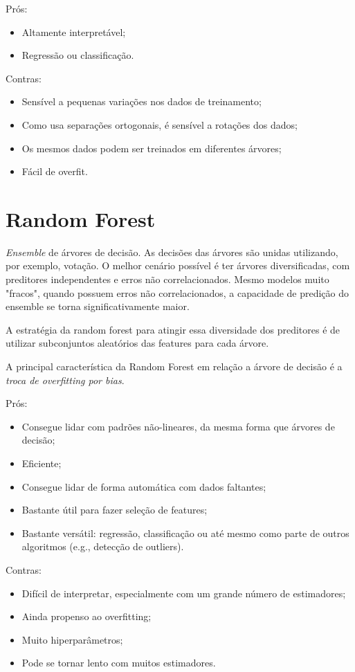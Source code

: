 Prós:
\begin{itemize}
    \item Altamente interpretável;
    \item Regressão ou classificação.
\end{itemize}
Contras:
\begin{itemize}
    \item Sensível a pequenas variações nos dados de treinamento;
    \item Como usa separações ortogonais, é sensível a rotações dos dados;
    \item Os mesmos dados podem ser treinados em diferentes árvores;
    \item Fácil de overfit.
\end{itemize}	

\section*{Random Forest}

\emph{Ensemble} de árvores de decisão. As decisões das árvores são unidas utilizando, por exemplo, votação. O melhor cenário possível é ter árvores diversificadas, com preditores independentes e erros não correlacionados. Mesmo modelos muito "fracos", quando possuem erros não correlacionados, a capacidade de predição do ensemble se torna significativamente maior.

A estratégia da random forest para atingir essa diversidade dos preditores é de utilizar subconjuntos aleatórios das features para cada árvore.

A principal característica da Random Forest em relação a árvore de decisão é a \emph{troca de overfitting por bias}.

Prós:
\begin{itemize}
    \item Consegue lidar com padrões não-lineares, da mesma forma que árvores de decisão;
    \item Eficiente;
    \item Consegue lidar de forma automática com dados faltantes;
    \item Bastante útil para fazer seleção de features;
    \item Bastante versátil: regressão, classificação ou até mesmo como parte de outros algoritmos (e.g., detecção de outliers).
\end{itemize}
Contras:
\begin{itemize}
    \item Difícil de interpretar, especialmente com um grande número de estimadores;
    \item Ainda propenso ao overfitting;
    \item Muito hiperparâmetros;
    \item Pode se tornar lento com muitos estimadores.
\end{itemize}



